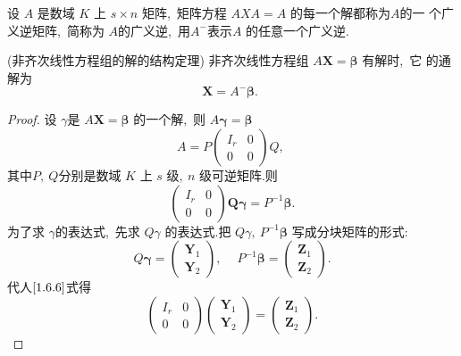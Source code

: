 \begin{definition}
	设 $ A $ 是数域  $K$  上  $s \times n $ 矩阵,\ 矩阵方程 $ A X A=A $ 的每一个解都称为$  A  $的一 个广义逆矩阵,\  简称为 $ A  $的广义逆,\  用$  A^{-} $表示$  A $ 的任意一个广义逆.
\end{definition}
\begin{theorem}
	(非齐次线性方程组的解的结构定理) 非齐次线性方程组 $ A \boldsymbol{X}=\boldsymbol{\beta}$  有解时,\  它 的通解为
	$$\boldsymbol{X}=A^{-} \boldsymbol{\beta} \text {. }$$
\end{theorem}
\begin{proof}
	设 $ \gamma  $是  $A \boldsymbol{X}=\boldsymbol{\beta} $ 的一个解,\  则 $ A \boldsymbol{\gamma}=\boldsymbol{\beta} $
	$$A=P\left(\begin{array}{ll}
		I_{r} & 0 \\
		0 & 0
	\end{array}\right) Q,\ $$
	其中$  P ,\ Q  $分别是数域 $ K $ 上  $s $ 级$,\   n$  级可逆矩阵.则
	\begin{equation}
		\left(\begin{array}{cc}
			I_{r} & 0 \\
			0 & 0
		\end{array}\right) \boldsymbol{Q \gamma}=P^{-1} \boldsymbol{\beta} .\label{1.6.6}
	\end{equation}
	为了求  $\gamma  $的表达式,\  先求 $ Q \gamma $ 的表达式.把 $ Q \gamma,\  P^{-1} \boldsymbol{\beta}$  写成分块矩阵的形式:
	$$Q \boldsymbol{\gamma}=\left(\begin{array}{l}
		\boldsymbol{Y}_{1} \\
		\mathbf{Y}_{2}
	\end{array}\right),\  \quad P^{-1} \boldsymbol{\beta}=\left(\begin{array}{l}
		\boldsymbol{Z}_{1} \\
		\boldsymbol{Z}_{2}
	\end{array}\right).$$
	代人$\eqref{1.6.6}$式得
	$$\left(\begin{array}{ll}
		I_{r} & 0 \\
		0 & 0
	\end{array}\right)\left(\begin{array}{l}
		\boldsymbol{Y}_{1} \\
		\boldsymbol{Y}_{2}
	\end{array}\right)=\left(\begin{array}{l}
		\boldsymbol{Z}_{1} \\
		\boldsymbol{Z}_{2}
	\end{array}\right) .$$

\end{proof}
